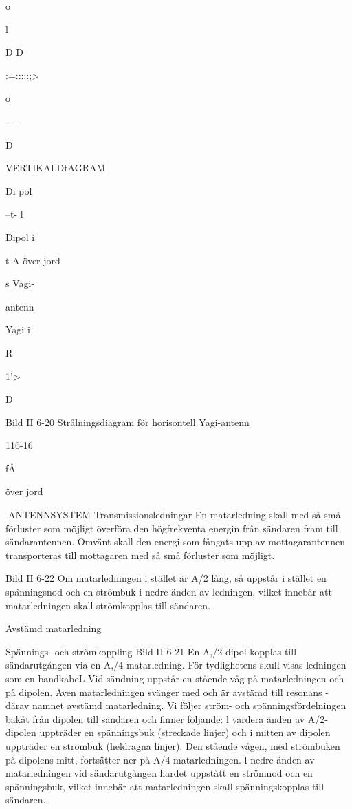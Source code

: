 {{o

l

D D

:=:::::;>

o

--~-

D

VERTIKALDtAGRAM

Di pol

--t- l

Dipol i

t A över jord

s
Vagi-

antenn

Yagi i

R

1'>

D

Bild II 6-20 Strålningsdiagram för horisontell Yagi-antenn

116-16

fÅ

över jord

ANTENNSYSTEM
Transmissionsledningar
En matarledning skall med så små förluster
som möjligt överföra den högfrekventa energin från sändaren fram till sändarantennen.
Omvänt skall den energi som fångats upp
av mottagarantennen transporteras till mottagaren med så små förluster som möjligt.

Bild II 6-22
Om matarledningen i stället är A/2 lång, så
uppstår i stället en spänningsnod och en
strömbuk i nedre änden av ledningen, vilket
innebär att matarledningen skall strömkopplas till sändaren.

Avstämd matarledning

Spännings- och strömkoppling
Bild II 6-21
En A,/2-dipol kopplas till sändarutgången via
en A,/4 matarledning. För tydlighetens skull
visas ledningen som en bandkabeL
Vid sändning uppstår en stående våg på
matarledningen och på dipolen. Även matarledningen svänger med och är avstämd
till resonans - därav namnet avstämd matarledning.
Vi följer ström- och spänningsfördelningen bakåt från dipolen till sändaren och finner
följande:
l vardera änden av A/2-dipolen uppträder en spänningsbuk (streckade linjer) och
i mitten av dipolen uppträder en strömbuk
(heldragna linjer). Den stående vågen, med
strömbuken på dipolens mitt, fortsätter ner
på A/4-matarledningen. l nedre änden av
matarledningen vid sändarutgången hardet
uppstått en strömnod och en spänningsbuk,
vilket innebär att matarledningen skall
spänningskopplas till sändaren.

}}
